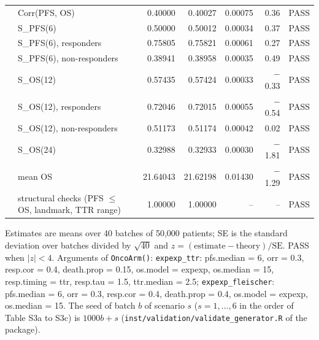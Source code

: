 \begin{table}[htbp]
\begin{threeparttable}
\begin{tabular}{p{2.4cm}p{4.2cm}rrrrl}
 & Corr(PFS, OS) & 0.40000 & 0.40027 & 0.00075 & 0.36 & PASS \\
 & S\_PFS(6) & 0.50000 & 0.50012 & 0.00034 & 0.37 & PASS \\
 & S\_PFS(6), responders & 0.75805 & 0.75821 & 0.00061 & 0.27 & PASS \\
 & S\_PFS(6), non-responders & 0.38941 & 0.38958 & 0.00035 & 0.49 & PASS \\
 & S\_OS(12) & 0.57435 & 0.57424 & 0.00033 & $-$0.33 & PASS \\
 & S\_OS(12), responders & 0.72046 & 0.72015 & 0.00055 & $-$0.54 & PASS \\
 & S\_OS(12), non-responders & 0.51173 & 0.51174 & 0.00042 & 0.02 & PASS \\
 & S\_OS(24) & 0.32988 & 0.32933 & 0.00030 & $-$1.81 & PASS \\
 & mean OS & 21.64043 & 21.62198 & 0.01430 & $-$1.29 & PASS \\
 & structural checks (PFS $\le$ OS, landmark, TTR range) & 1.00000 & 1.00000 & -- & -- & PASS \\
\bottomrule
\end{tabular}
\begin{tablenotes}
\footnotesize
\item Estimates are means over 40 batches of 50,000 patients; SE is the standard deviation over batches divided by $\sqrt{40}$ and $z = (\mathrm{estimate} - \mathrm{theory}) / \mathrm{SE}$. PASS when $|z| < 4$. Arguments of \texttt{OncoArm()}: \texttt{expexp\_ttr}: pfs.median = 6, orr = 0.3, resp.cor = 0.4, death.prop = 0.15, os.model = expexp, os.median = 15, resp.timing = ttr, resp.tau = 1.5, ttr.median = 2.5; \texttt{expexp\_fleischer}: pfs.median = 6, orr = 0.3, resp.cor = 0.4, death.prop = 0.4, os.model = expexp, os.median = 15. The seed of batch $b$ of scenario $s$ ($s = 1, \ldots, 6$ in the order of Table S3a to S3c) is $1000 b + s$ (\texttt{inst/validation/validate\_generator.R} of the package).
\end{tablenotes}
\end{threeparttable}
\end{table}
